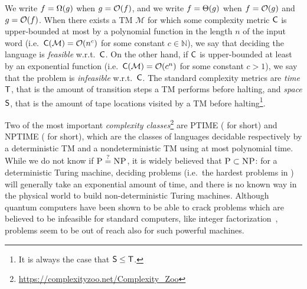 We write \(f = \BigOmega{g}\) when \(g = \BigO{f}\), and we write \(f = \BigTheta{g}\) when 
\(f = \BigO{g}\) and \(g = \BigO{f}\).
When there exists a TM \(\mathcal{M}\) for which some complexity metric \(\mathsf{C} \) is 
upper-bounded at most by a polynomial function in the length \(n\) of the input word 
(i.e.\  \(\call{\Complexity}{\mathcal{M}} = \BigO{n^c}\) for some constant \(c \in \mathbb{N}\)), 
we say that deciding the language is \emph{feasible} w.r.t.\  \(\mathsf{C} \). 
On the other hand, if \(\mathsf{C} \) is upper-bounded at least by an 
exponential function (i.e.\  \(\call{\Complexity}{\mathcal{M}} = \BigO{c^{n}}\) for some constant 
\(c > 1\)), we say that the problem is \emph{infeasible} w.r.t.\  \(\mathsf{C} \).
The standard complexity metrics are \emph{time} \(\mathsf{T} \), that is the amount of transition steps 
a TM performs before halting, and \emph{space} \(\mathsf{S} \), that is the amount of tape locations 
visited by a TM before halting\footnote{It is always the case that \(\mathsf{S} \le \mathsf{T} \).}.

Two of the most important 
\emph{complexity classes}\footnote{\url{https://complexityzoo.net/Complexity_Zoo}} 
are \textsc{PTIME} (\Ptime{} for short) and \textsc{NPTIME} (\NPtime{} for short), which are the 
classes of languages decidable respectively by a deterministic TM and a nondeterministic TM using 
at most polynomial time.
While we do not know if \(\textnormal{\textsc{P}} \mathrel{\overset{?}{=}} \textnormal{\textsc{NP}} \), it is widely believed that 
\(\textnormal{\textsc{P}} \subset \textnormal{\textsc{NP}} \): for a deterministic Turing machine, deciding \NPcomplete{} problems 
(i.e.\ the hardest problems in \NPtime{}) will generally take an exponential amount of 
time, and there is no known way in the physical world to build non-deterministic Turing machines.
Although quantum computers have been shown to be able to crack problems which are believed to 
be infeasible for standard computers, like integer factorization~\cite{Shor1994}, \NPcomplete{}
problems seem to be out of reach also for such powerful machines.
